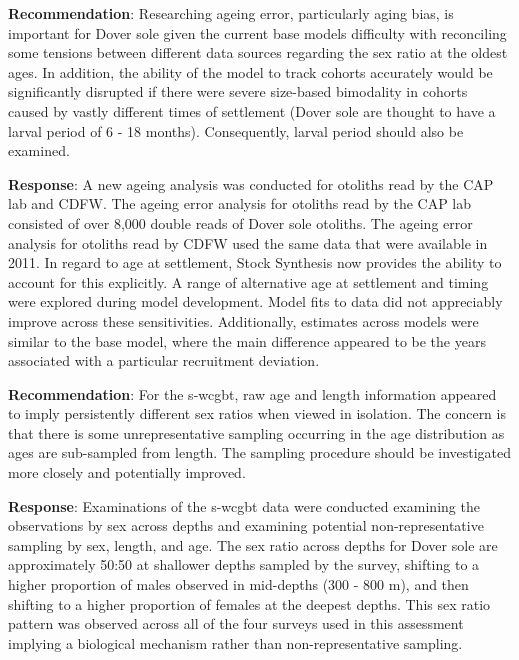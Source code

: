 \documentclass[11pt,
  english,
  a4paper,
]{article}
\begin{document}

\textbf{Recommendation}: Researching ageing error, particularly aging bias, is important for Dover sole given the current base models difficulty with reconciling some tensions between different data sources regarding the sex ratio at the oldest ages. In addition, the ability of the model to track cohorts accurately would be significantly disrupted if there were severe size-based bimodality in cohorts caused by vastly different times of settlement (Dover sole are thought to have a larval period of 6 - 18 months). Consequently, larval period should also be examined.

\leavevmode\tagmcend\tagstructend\par


\textbf{Response}: A new ageing analysis was conducted for otoliths read by the CAP lab and CDFW. The ageing error analysis for otoliths read by the CAP lab consisted of over 8,000 double reads of Dover sole otoliths. The ageing error analysis for otoliths read by CDFW used the same data that were available in 2011. In regard to age at settlement, Stock Synthesis now provides the ability to account for this explicitly. A range of alternative age at settlement and timing were explored during model development. Model fits to data did not appreciably improve across these sensitivities. Additionally, estimates across models were similar to the base model, where the main difference appeared to be the years associated with a particular recruitment deviation.

\leavevmode\tagmcend\tagstructend\par


\textbf{Recommendation}: For the \gls{s-wcgbt}, raw age and length information appeared to imply persistently different sex ratios when viewed in isolation. The concern is that there is some unrepresentative sampling occurring in the age distribution as ages are sub-sampled from length. The sampling procedure should be investigated more closely and potentially improved.

\leavevmode\tagmcend\tagstructend\par


\textbf{Response}: Examinations of the \gls{s-wcgbt} data were conducted examining the observations by sex across depths and examining potential non-representative sampling by sex, length, and age. The sex ratio across depths for Dover sole are approximately 50:50 at shallower depths sampled by the survey, shifting to a higher proportion of males observed in mid-depths (300 - 800 m), and then shifting to a higher proportion of females at the deepest depths. This sex ratio pattern was observed across all of the four surveys used in this assessment implying a biological mechanism rather than non-representative sampling.
\end{document}
